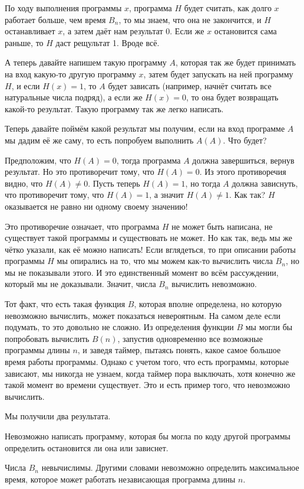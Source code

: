 По ходу выполнения программы $x$, программа $H$ будет считать, как долго $x$ работает больше, чем время $B_n$, то мы знаем, что она не закончится, и $H$ останавливает $x$, а затем даёт нам результат 0. Если же $x$ остановится сама раньше, то $H$ даст рещультат 1. Вроде всё.

А теперь давайте напишем такую программу $A$, которая так же будет принимать на вход какую-то другую программу $x$, затем будет запускать на ней программу $H$, и если $H(x)=1$, то $A$ будет зависать (например, начнёт считать все натуральные числа подряд), а если же $H(x)=0$, то она будет возвращать какой-то результат. Такую программу так же легко написать.

Теперь давайте поймём какой результат мы получим, если на вход программе $A$ мы дадим её же саму, то есть попробуем выполнить $A(A)$. Что будет?

Предположим, что $H(A)=0$, тогда программа $A$ должна завершиться, вернув результат. Но это противоречит тому, что $H(A)=0$. Из этого противоречия видно, что $H(A)\not=0$. Пусть теперь $H(A)=1$, но тогда $A$ должна зависнуть, что противоречит тому, что $H(A)=1$, а значит $H(A)\not=1$. Как так? $H$ оказывается не равно ни одному своему значению!

Это противоречие означает, что программа $H$ не может быть написана, не существует такой программы и существовать не может. Но как так, ведь мы же чётко указали, как её можно написать! Если вглядеться, то при описании работы программы $H$ мы опирались на то, что мы можем как-то вычислить числа $B_n$, но мы не показывали этого. И это единственный момент во всём рассуждении, который мы не доказывали. Значит, числа $B_n$ вычислить невозможно.

Тот факт, что есть такая функция $B$, которая вполне определена, но которую невозможно вычислить, может показаться невероятным. На самом деле если подумать, то это довольно не сложно. Из определения функции $B$ мы могли бы попробовать вычислить $B(n)$, запустив одновременно все возможные программы длины $n$, и заведя таймер, пытаясь понять, какое самое большое время работы программы. Однако с учетом того, что есть программы, которые зависают, мы никогда не узнаем, когда таймер пора выключать, хотя конечно же такой момент во времени существует. Это и есть пример того, что  невозможно вычислить.

Мы получили два результата.

\begin{thm}
Невозможно написать программу, которая бы могла по коду другой программы определить остановится ли она или зависнет.
\end{thm}
\begin{thm}
Числа $B_n$ невычислимы. Другими словами невозможно определить максимальное время, которое может работать независающая программа длины $n$.
\end{thm}

